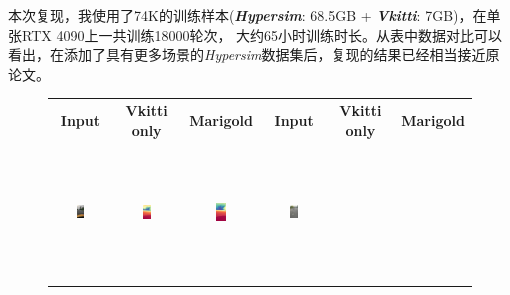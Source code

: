 \documentclass{article}
\begin{document}
本次复现，我使用了74K的训练样本(\textit{\textbf{Hypersim}}: 68.5GB + \textit{\textbf{Vkitti}}: 7GB)，在单张RTX 4090上一共训练18000轮次，
大约65小时训练时长。从表中数据对比可以看出，在添加了具有更多场景的\textit{Hypersim}数据集后，复现的结果已经相当接近原论文。

\begin{figure}[H]
  \centering
  \small %
  \setlength{\tabcolsep}{2pt} %
  \begin{tabular}{cccccc}
    \textbf{Input} & \textbf{Vkitti only} & \textbf{Marigold} & \textbf{Input} & \textbf{Vkitti only} & \textbf{Marigold} \\
    \includegraphics[width=0.15\textwidth,height=3.5cm,keepaspectratio]{images/on-the-road/1.jpg} &
    \includegraphics[width=0.15\textwidth,height=3.5cm,keepaspectratio]{images/real_image_trained/depth_colored/1.png} &
    \includegraphics[width=0.15\textwidth,height=3.5cm,keepaspectratio]{images/real_image/depth_colored/1.png} &
    \includegraphics[width=0.15\textwidth,height=3.5cm,keepaspectratio]{images/on-the-road/2.jpg} &

\end{tabular}
\end{figure}
\end{document}
